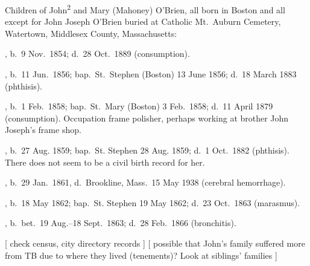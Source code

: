 \begin{KidsIntro}
	Children of John\textsuperscript{2} and Mary (Mahoney) O'Brien, all born in Boston and all except for John Joseph O'Brien buried at Catholic Mt.\ Auburn Cemetery, Watertown, Middlesex County, Massachusetts:\cite{BillMcEvoy}
\end{KidsIntro}

\begin{Kids}
	, b.\ 9 Nov.\ 1854; d.\ 28 Oct.\ 1889 (consumption).
	
	, b.\ 11 Jun.\ 1856;\cite{Mary3OBrienBirth} bap.\ St.\ Stephen (Boston) 13 June 1856;\cite{Mary3OBrienBaptism} d.\ 18 March 1883 (phthisis).\cite{Mary3OBrienDeath}
	
	, b.\ 1 Feb.\ 1858;\cite{James3OBrienBirth} bap.\ St.\ Mary (Boston) 3 Feb.\ 1858;\cite{James3OBrienBaptism} d.\ 11 April 1879 (consumption). Occupation frame polisher,\cite{James3OBrienDeath} perhaps working at brother John Joseph's frame shop.
	
	, b.\ 27 Aug. 1859;\cite{Ellen3OBrienBaptism} bap.\ St. Stephen 28 Aug. 1859;\cite{Ellen3OBrienBaptism} d.\ 1 Oct.\ 1882 (phthisis).\cite{Ellen3OBrienDeath} There does not seem to be a civil birth record for her.
	
	, b.\ 29 Jan.\ 1861, d.\ Brookline, Mass.\ 15 May 1938 (cerebral hemorrhage).
	
	, b.\ 18 May 1862;\cite{Margaret3OBrienBaptism} bap.\ St. Stephen 19 May 1862;\cite{Margaret3OBrienBaptism} d.\ 23 Oct.\ 1863 (marasmus).\cite{Margaret3OBrienDeath}
	
	, b.\ bet.\ 19 Aug.--18 Sept.\ 1863;\cite{Anna3OBrienDeath} d.\ 28 Feb.\ 1866 (bronchitis).\cite{Anna3OBrienDeath}
	
[ check census, city directory records ]
[ possible that John's family suffered more from TB due to where they lived (tenements)? Look at siblings' families ]
	
\end{Kids}